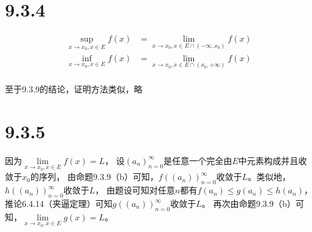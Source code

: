 \documentclass{article}
\begin{document}
\section*{9.3.4}

\begin{align*}
  \sup\limits_{x \rightarrow x_0, x \in E}f(x) & = \lim\limits_{x \rightarrow x_0, x \in E \cap (-\infty, x_0)}f(x) \\
  \inf\limits_{x \rightarrow x_0, x \in E}f(x) & = \lim\limits_{x \rightarrow x_0, x \in E \cap (x_0, +\infty)}f(x) \\
\end{align*}

至于9.3.9的结论，证明方法类似，略

\section*{9.3.5}

因为$\lim\limits_{x \rightarrow x_0, x \in E}f(x) = L$，
设$(a_n)_{n=0}^\infty$是任意一个完全由$E$中元素构成并且收敛于$x_0$的序列，
由命题9.3.9（b）可知，$f((a_n))_{n=0}^\infty$收敛于$L$。类似地，$h((a_n))_{n=0}^\infty$收敛于$L$，
由题设可知对任意$n$都有$f(a_n) \leq g(a_n) \leq h(a_n)$，
推论6.4.14（夹逼定理）可知$g((a_n))_{n=0}^\infty$收敛于$L$。
再次由命题9.3.9（b）可知，$\lim\limits_{x \rightarrow x_0, x \in E}g(x) = L$。
\end{document}
